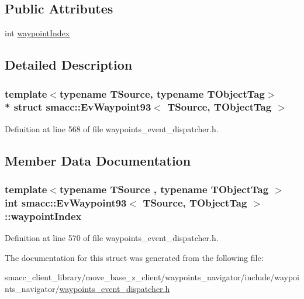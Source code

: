 \subsection*{Public Attributes}
\begin{DoxyCompactItemize}
\item 
int \hyperlink{structsmacc_1_1EvWaypoint93_a192286fb3d16720d94bd060417d30da7}{waypoint\+Index}
\end{DoxyCompactItemize}


\subsection{Detailed Description}
\subsubsection*{template$<$typename T\+Source, typename T\+Object\+Tag$>$\\*
struct smacc\+::\+Ev\+Waypoint93$<$ T\+Source, T\+Object\+Tag $>$}



Definition at line 568 of file waypoints\+\_\+event\+\_\+dispatcher.\+h.



\subsection{Member Data Documentation}
\subsubsection[{\texorpdfstring{waypoint\+Index}{waypointIndex}}]{\setlength{\rightskip}{0pt plus 5cm}template$<$typename T\+Source , typename T\+Object\+Tag $>$ int {\bf smacc\+::\+Ev\+Waypoint93}$<$ T\+Source, T\+Object\+Tag $>$\+::waypoint\+Index}\hypertarget{structsmacc_1_1EvWaypoint93_a192286fb3d16720d94bd060417d30da7}{}\label{structsmacc_1_1EvWaypoint93_a192286fb3d16720d94bd060417d30da7}


Definition at line 570 of file waypoints\+\_\+event\+\_\+dispatcher.\+h.



The documentation for this struct was generated from the following file\+:\begin{DoxyCompactItemize}
\item 
smacc\+\_\+client\+\_\+library/move\+\_\+base\+\_\+z\+\_\+client/waypoints\+\_\+navigator/include/waypoints\+\_\+navigator/\hyperlink{waypoints__event__dispatcher_8h}{waypoints\+\_\+event\+\_\+dispatcher.\+h}\end{DoxyCompactItemize}
